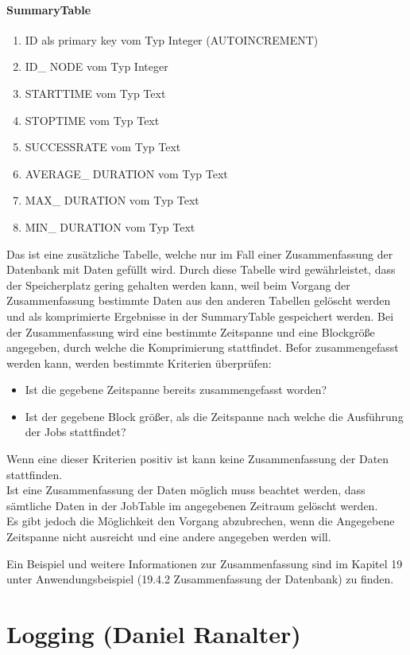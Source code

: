 \documentclass[12pt,a4paper]{report}
\begin{document}
\begin{onehalfspace}
\subsubsection{SummaryTable}
\begin{enumerate}
\item ID als primary key vom Typ Integer (AUTOINCREMENT)
\item ID\_ NODE vom Typ Integer
\item STARTTIME vom Typ Text
\item STOPTIME vom Typ Text
\item SUCCESSRATE vom Typ Text
\item AVERAGE\_ DURATION vom Typ Text
\item MAX\_ DURATION vom Typ Text
\item MIN\_ DURATION vom Typ Text
\end{enumerate}
Das ist eine zusätzliche Tabelle, welche nur im Fall einer Zusammenfassung der Datenbank mit Daten gefüllt wird.  Durch diese Tabelle wird gewährleistet, dass der Speicherplatz gering gehalten werden kann, weil beim Vorgang der Zusammenfassung bestimmte Daten aus den anderen Tabellen gelöscht werden und als komprimierte Ergebnisse in der SummaryTable gespeichert werden. Bei der Zusammenfassung wird eine bestimmte Zeitspanne und eine Blockgröße angegeben, durch welche die Komprimierung stattfindet. Befor zusammengefasst werden kann, werden bestimmte Kriterien überprüfen:
\begin{itemize}
\item Ist die gegebene Zeitspanne bereits zusammengefasst worden?
\item Ist der gegebene Block größer, als die Zeitspanne nach welche die Ausführung der Jobs stattfindet?
\end{itemize}
Wenn eine dieser Kriterien positiv ist kann keine Zusammenfassung der Daten stattfinden.
\\Ist eine Zusammenfassung der Daten möglich muss beachtet werden, dass sämtliche Daten in der JobTable im angegebenen Zeitraum gelöscht werden.\\

Es gibt jedoch die Möglichkeit den Vorgang abzubrechen, wenn die Angegebene Zeitspanne nicht ausreicht und eine andere angegeben werden will.

Ein Beispiel und weitere Informationen zur Zusammenfassung sind im Kapitel 19 unter Anwendungsbeispiel (19.4.2 Zusammenfassung der Datenbank) zu finden.


\chapter{Logging (Daniel Ranalter)}

\end{onehalfspace}
\end{document}
